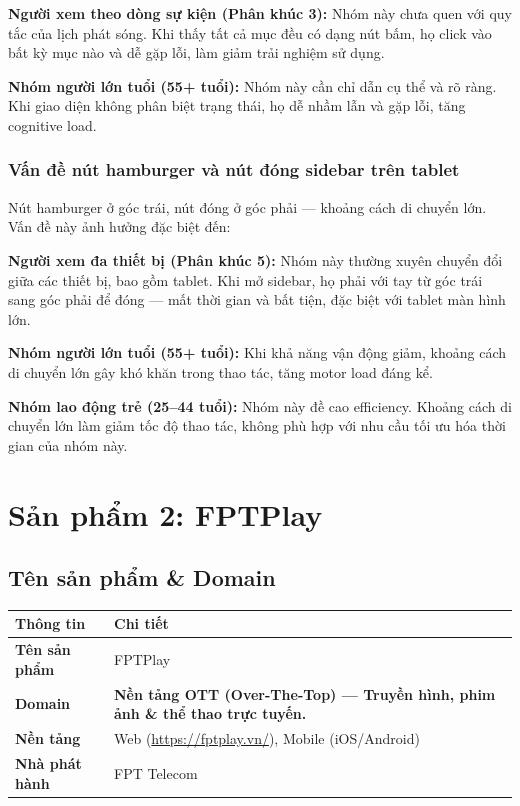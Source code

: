 \textbf{Người xem theo dòng sự kiện (Phân khúc 3):} Nhóm này chưa quen với quy tắc của lịch phát sóng. Khi thấy tất cả mục đều có dạng nút bấm, họ click vào bất kỳ mục nào và dễ gặp lỗi, làm giảm trải nghiệm sử dụng.

\textbf{Nhóm người lớn tuổi (55+ tuổi):} Nhóm này cần chỉ dẫn cụ thể và rõ ràng. Khi giao diện không phân biệt trạng thái, họ dễ nhầm lẫn và gặp lỗi, tăng cognitive load.

\subsubsection{Vấn đề nút hamburger và nút đóng sidebar trên tablet}

Nút hamburger ở góc trái, nút đóng ở góc phải --- khoảng cách di chuyển lớn. Vấn đề này ảnh hưởng đặc biệt đến:

\textbf{Người xem đa thiết bị (Phân khúc 5):} Nhóm này thường xuyên chuyển đổi giữa các thiết bị, bao gồm tablet. Khi mở sidebar, họ phải với tay từ góc trái sang góc phải để đóng --- mất thời gian và bất tiện, đặc biệt với tablet màn hình lớn.

\textbf{Nhóm người lớn tuổi (55+ tuổi):} Khi khả năng vận động giảm, khoảng cách di chuyển lớn gây khó khăn trong thao tác, tăng motor load đáng kể.

\textbf{Nhóm lao động trẻ (25--44 tuổi):} Nhóm này đề cao efficiency. Khoảng cách di chuyển lớn làm giảm tốc độ thao tác, không phù hợp với nhu cầu tối ưu hóa thời gian của nhóm này.

\bigskip
\section{Sản phẩm 2: FPTPlay}

\subsection{Tên sản phẩm \& Domain}

\begin{center}
\begin{tabularx}{\textwidth}{|l|X|}
\hline
\textbf{Thông tin} & \textbf{Chi tiết} \\
\hline
\textbf{Tên sản phẩm} & FPTPlay \\
\hline
\textbf{Domain} & \textbf{Nền tảng OTT (Over-The-Top) --- Truyền hình, phim ảnh \& thể thao trực tuyến.} \\
\hline
\textbf{Nền tảng} & Web (\url{https://fptplay.vn/}), Mobile (iOS/Android) \\
\hline
\textbf{Nhà phát hành} & FPT Telecom \\
\hline
\end{tabularx}
\end{center}

